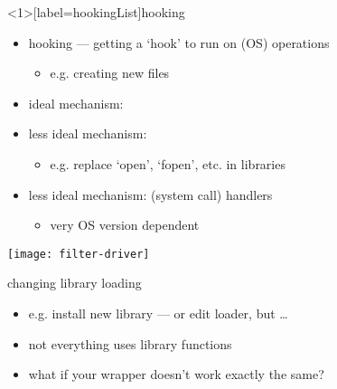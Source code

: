 \begin{frame}<1>[label=hookingList]{hooking}
    \begin{itemize}
    \item hooking --- getting a `hook' to run on (OS) operations
        \begin{itemize}
        \item e.g. creating new files
        \end{itemize}
    \item ideal mechanism: 
    \item less ideal mechanism: 
        \begin{itemize}
        \item e.g. replace `open', `fopen', etc. in libraries
        \end{itemize}
    \item less ideal mechanism:  (system call) handlers
        \begin{itemize}
        \item very OS version dependent
        \end{itemize} 
    \end{itemize}
\end{frame}


\begin{frame}
\texttt{[image: filter-driver]}
\end{frame}


\begin{frame}{changing library loading}
\begin{itemize}
    \item e.g. install new library --- or edit loader, but \ldots
    \vspace{.5cm}
    \item not everything uses library functions
    \item what if your wrapper doesn't work exactly the same?
\end{itemize}
\end{frame}


